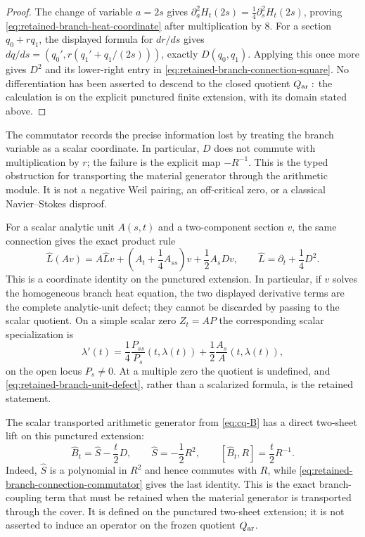 \begin{proof}
The change of variable $a=2s$ gives
$\partial_a^2H_t(2s)=\frac14\partial_s^2H_t(2s)$, proving
\eqref{eq:retained-branch-heat-coordinate} after multiplication by $8$.
For a section $q_0+r q_1$, the displayed formula for $dr/ds$ gives
$dq/ds=(q_0',r(q_1'+q_1/(2s)))$, exactly $D(q_0,q_1)$.
Applying this once more gives $D^2$ and its lower-right entry in
\eqref{eq:retained-branch-connection-square}. No differentiation has
been asserted to descend to the closed quotient $Q_{\rm ar}:$ the
calculation is on the explicit punctured finite extension, with its domain
stated above.
\end{proof}

The commutator records the precise information lost by treating the branch
variable as a scalar coordinate. In particular, $D$ does not commute with
multiplication by $r$; the failure is the explicit map $-R^{-1}$. This is
the typed obstruction for transporting the material generator through the
arithmetic module. It is not a negative Weil pairing, an off-critical zero,
or a classical Navier--Stokes disproof.

For a scalar analytic unit $A(s,t)$ and a two-component section $v$, the same
connection gives the exact product rule
\begin{equation}
 \widehat L(Av)=A\widehat L v
 +\left(A_t+\frac14A_{ss}\right)v
 +\frac12 A_sDv,
 \qquad \widehat L=\partial_t+\frac14D^2.
 \label{eq:retained-branch-unit-defect}
\end{equation}
This is a coordinate identity on the punctured extension.  In particular,
if $v$ solves the homogeneous branch heat equation, the two displayed
derivative terms are the complete analytic-unit defect; they cannot be
discarded by passing to the scalar quotient.  On a simple scalar zero
$Z_t=A P$ the corresponding scalar specialization is
\begin{equation}
 \lambda'(t)=\frac14\frac{P_{ss}}{P_s}(t,\lambda(t))
             +\frac12\frac{A_s}{A}(t,\lambda(t)),
 \label{eq:retained-branch-zero-motion}
\end{equation}
on the open locus $P_s\ne0$.  At a multiple zero the quotient is undefined,
and \eqref{eq:retained-branch-unit-defect}, rather than a scalarized formula,
is the retained statement.

The scalar transported arithmetic generator from
\eqref{eq:cq-B} has a direct two-sheet lift on this punctured extension:
\begin{equation}
 \widehat B_t=\widehat S-\frac t2D,
 \qquad \widehat S=-\frac12R^2,
 \qquad [\widehat B_t,R]=\frac t2R^{-1}.
 \label{eq:retained-branch-generator}
\end{equation}
Indeed, $\widehat S$ is a polynomial in $R^2$ and hence commutes with $R$,
while \eqref{eq:retained-branch-connection-commutator} gives the last
identity. This is the exact branch-coupling term that must be retained when
the material generator is transported through the cover. It is defined on
the punctured two-sheet extension; it is not asserted to induce an operator
on the frozen quotient $Q_{\rm ar}$.

